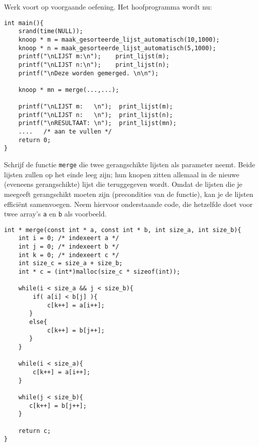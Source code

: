 \beginoef
Werk voort op voorgaande oefening. Het hoofprogramma wordt nu:
\vspace{-3mm}
\begin{footnotesize}
\begin{verbatim}
int main(){
    srand(time(NULL));	
    knoop * m = maak_gesorteerde_lijst_automatisch(10,1000);
    knoop * n = maak_gesorteerde_lijst_automatisch(5,1000);
    printf("\nLIJST m:\n");    print_lijst(m);
    printf("\nLIJST n:\n");    print_lijst(n);
    printf("\nDeze worden gemerged. \n\n");
    
    knoop * mn = merge(...,...);	
	
    printf("\nLIJST m:   \n");	print_lijst(m);
    printf("\nLIJST n:   \n");	print_lijst(n);
    printf("\nRESULTAAT: \n");	print_lijst(mn);	
    ....   /* aan te vullen */
    return 0;
}
\end{verbatim}
\end{footnotesize}
Schrijf de functie \verb}merge} die twee gerangschikte lijsten als parameter neemt. Beide lijsten zullen op het einde leeg zijn; hun knopen zitten allemaal in de nieuwe (eveneens gerangschikte) 
lijst die teruggegeven wordt. Omdat de lijsten die je meegeeft gerangschikt moeten zijn (precondities van de functie), kan je de lijsten effici\"ent samenvoegen.
Neem hiervoor onderstaande code, die hetzelfde doet voor twee array's \verb{a{ en \verb{b{ als voorbeeld.
\begin{footnotesize}
\begin{verbatim}
int * merge(const int * a, const int * b, int size_a, int size_b){	
    int i = 0; /* indexeert a */
    int j = 0; /* indexeert b */
    int k = 0; /* indexeert c */	
    int size_c = size_a + size_b;
    int * c = (int*)malloc(size_c * sizeof(int));
	
    while(i < size_a && j < size_b){
        if( a[i] < b[j] ){
            c[k++] = a[i++]; 	
       }
       else{
            c[k++] = b[j++];	
       }
    }

    while(i < size_a){
        c[k++] = a[i++];	
    }

    while(j < size_b){
       c[k++] = b[j++];	
    }

    return c;
}
\end{verbatim}
\end{footnotesize}
	
\endoef

